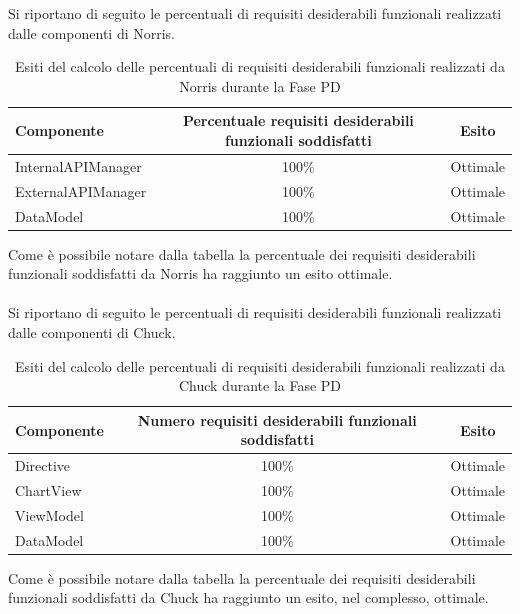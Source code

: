 				Si riportano di seguito le percentuali di requisiti desiderabili funzionali realizzati dalle componenti di Norris.
				\begin{table}[H]
					\centering
						\begin{tabu}{| l | c | c |}
							\hline
							Componente			& 	Percentuale requisiti desiderabili funzionali soddisfatti	& Esito		\\ \hline \hline
							InternalAPIManager	& 	100\% 	& Ottimale  \\ \hline
							ExternalAPIManager  & 	100\%	& Ottimale  \\ \hline
							DataModel  			& 	100\%	& Ottimale  \\ \hline
						\end{tabu}
					\caption{Esiti del calcolo delle percentuali di requisiti desiderabili funzionali realizzati da Norris durante la Fase PD}
				\end{table}
				Come è possibile notare dalla tabella la percentuale dei requisiti desiderabili funzionali soddisfatti da Norris ha raggiunto un esito ottimale. 
				\\ \\
				Si riportano di seguito le percentuali di requisiti desiderabili funzionali realizzati dalle componenti di Chuck.
				\begin{table}[H]
					\centering
						\begin{tabu}{| l | c | c |}
							\hline
							Componente	& Numero requisiti desiderabili funzionali soddisfatti	& Esito		\\ \hline \hline
							Directive	&	100\% 	& Ottimale  \\ \hline
							ChartView	& 	100\%	& Ottimale  \\ \hline
							ViewModel	& 	100\%	& Ottimale  \\ \hline
							DataModel	& 	100\%	& Ottimale  	\\ \hline
						\end{tabu}
					\caption{Esiti del calcolo delle percentuali di requisiti desiderabili funzionali realizzati da Chuck durante la Fase PD}
				\end{table}
				Come è possibile notare dalla tabella la percentuale dei requisiti desiderabili funzionali soddisfatti da Chuck ha raggiunto un esito, nel complesso, ottimale.

